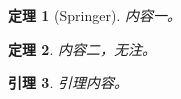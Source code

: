 \documentclass[UTF8, a4paper, 12pt, fontset=fandol, scheme=chinese]{ctexart}
\theoremstyle{cnplain}
\newtheorem{thm}{定理}[section]
\newtheorem{lem}[thm]{引理}
\begin{document}
\begin{thm}[Springer] 内容一。\end{thm}
\begin{thm} 内容二，无注。\end{thm}
\begin{lem} 引理内容。\end{lem}
\end{document}
